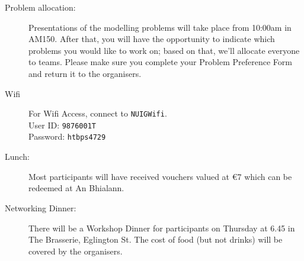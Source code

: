 \documentclass[a4paper, 11pt]{article}
\begin{document}
\begin{description}
\item [Problem allocation:]
  Presentations of the modelling problems will take place from 10:00am in
  AM150. After that, you will have the opportunity to indicate which
  problems you would like to work on; based on that, we'll allocate
  everyone to teams. Please make sure you complete your Problem
  Preference Form and return it to the organisers.


\item[Wifi] For Wifi Access, connect to \texttt{NUIGWifi}.\\
    User ID: \texttt{9876001T}\\
    Password: \texttt{htbps4729}

  \item[Lunch:] Most participants will have received vouchers valued
    at \euro 7 which can be redeemed at An Bhialann.
    
  \item[Networking Dinner:] There will be a Workshop Dinner for
    participants on Thursday at 6.45 in The Brasserie, Eglington
    St. The cost of food (but not drinks) will be covered by 
    the organisers.
  
\end{description}
\end{document}
